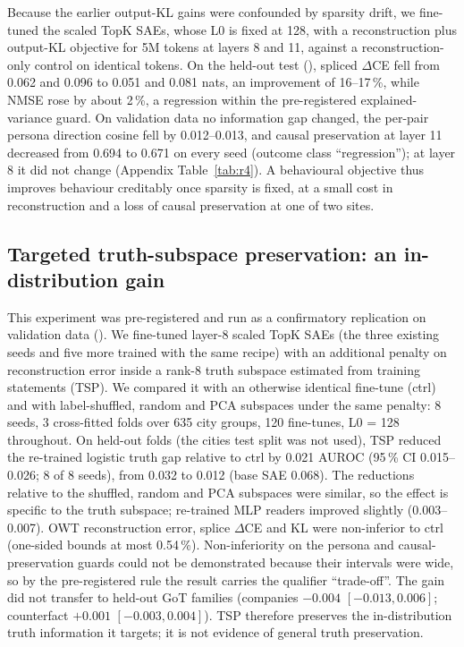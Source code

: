 Because the earlier output-KL gains were confounded by sparsity drift, we fine-tuned the scaled TopK SAEs, whose L0
is fixed at 128, with a reconstruction plus output-KL objective \citep{karvonen2025kl,braun2024e2e} for 5M tokens at
layers 8 and 11, against a reconstruction-only control on identical tokens. On the held-out test (), spliced $\Delta$CE fell from 0.062 and 0.096 to 0.051 and 0.081 nats, an improvement of 16--17\,\%, while NMSE
rose by about 2\,\%, a regression within the pre-registered explained-variance guard. On validation data no information
gap changed, the per-pair persona direction cosine fell by 0.012--0.013, and causal preservation at layer 11 decreased
from 0.694 to 0.671 on every seed (outcome class ``regression''); at layer 8 it did not change (Appendix Table~\ref{tab:r4}). A
behavioural objective thus improves behaviour creditably once sparsity is fixed, at a small cost in reconstruction and
a loss of causal preservation at one of two sites.

\subsection{Targeted truth-subspace preservation: an in-distribution gain}\label{sec:tsp}

This experiment was pre-registered and run as a confirmatory replication on validation data ().
We fine-tuned layer-8 scaled TopK SAEs (the three existing seeds and five more trained with the same recipe) with an
additional penalty on reconstruction error inside a rank-8 truth subspace estimated from training statements (TSP). We
compared it with an otherwise identical fine-tune (ctrl) and with label-shuffled, random and PCA subspaces under the
same penalty: 8 seeds, 3 cross-fitted folds over 635 city groups, 120 fine-tunes, L0 = 128 throughout. On held-out
folds (the cities test split was not used), TSP reduced the re-trained logistic truth gap relative to ctrl by 0.021
AUROC (95\,\% CI 0.015--0.026; 8 of 8 seeds), from 0.032 to 0.012 (base SAE 0.068). The reductions relative to the
shuffled, random and PCA subspaces were similar, so the effect is specific to the truth subspace; re-trained MLP readers
improved slightly (0.003--0.007). OWT reconstruction error, splice $\Delta$CE and KL were non-inferior to ctrl
(one-sided bounds at most 0.54\,\%). Non-inferiority on the persona and causal-preservation guards could not be
demonstrated because their intervals were wide, so by the pre-registered rule the result carries the qualifier
``trade-off''. The gain did not transfer to held-out GoT families (companies $-0.004$ $[-0.013, 0.006]$; counterfact
$+0.001$ $[-0.003, 0.004]$). TSP therefore preserves the in-distribution truth information it targets; it is not
evidence of general truth preservation.


